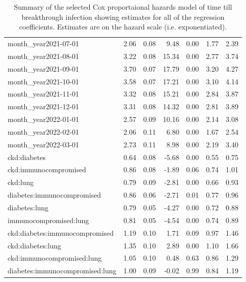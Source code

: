 \begin{table}[!htbp]
\begin{tabular}{lrrrrrr}
  month\_year2021-07-01 & 2.06 & 0.08 & 9.48 & 0.00 & 1.77 & 2.39 \\ 
  month\_year2021-08-01 & 3.22 & 0.08 & 15.34 & 0.00 & 2.77 & 3.74 \\ 
  month\_year2021-09-01 & 3.70 & 0.07 & 17.79 & 0.00 & 3.20 & 4.27 \\ 
  month\_year2021-10-01 & 3.58 & 0.07 & 17.21 & 0.00 & 3.10 & 4.14 \\ 
  month\_year2021-11-01 & 3.32 & 0.08 & 15.21 & 0.00 & 2.84 & 3.87 \\ 
  month\_year2021-12-01 & 3.31 & 0.08 & 14.32 & 0.00 & 2.81 & 3.89 \\ 
  month\_year2022-01-01 & 2.57 & 0.09 & 10.16 & 0.00 & 2.14 & 3.08 \\ 
  month\_year2022-02-01 & 2.06 & 0.11 & 6.80 & 0.00 & 1.67 & 2.54 \\ 
  month\_year2022-03-01 & 2.73 & 0.11 & 8.98 & 0.00 & 2.19 & 3.40 \\ 
  ckd:diabetes & 0.64 & 0.08 & -5.68 & 0.00 & 0.55 & 0.75 \\ 
  ckd:immunocompromised & 0.86 & 0.08 & -1.89 & 0.06 & 0.74 & 1.01 \\ 
  ckd:lung & 0.79 & 0.09 & -2.81 & 0.00 & 0.66 & 0.93 \\ 
  diabetes:immunocompromised & 0.86 & 0.06 & -2.71 & 0.01 & 0.77 & 0.96 \\ 
  diabetes:lung & 0.79 & 0.05 & -4.27 & 0.00 & 0.72 & 0.88 \\ 
  immunocompromised:lung & 0.81 & 0.05 & -4.54 & 0.00 & 0.74 & 0.89 \\ 
  ckd:diabetes:immunocompromised & 1.19 & 0.10 & 1.71 & 0.09 & 0.97 & 1.46 \\ 
  ckd:diabetes:lung & 1.35 & 0.10 & 2.89 & 0.00 & 1.10 & 1.66 \\ 
  ckd:immunocompromised:lung & 1.05 & 0.10 & 0.48 & 0.63 & 0.86 & 1.29 \\ 
  diabetes:immunocompromised:lung & 1.00 & 0.09 & -0.02 & 0.99 & 0.84 & 1.19 \\ 
   \hline
\end{tabular}
\caption{Summary of the selected Cox proportaional hazards model of time till breakthrough infection showing estimates for all of the regression coefficients. Estimates are on the hazard scale (i.e. exponentiated).} 
\label{tab:summary_survival_breakthrough}
\end{table}
